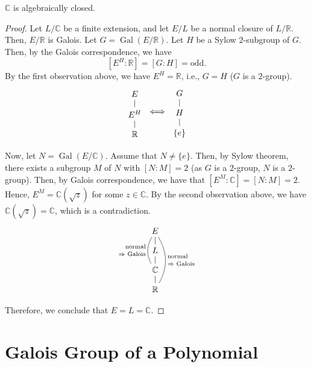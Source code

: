 \documentclass[twoside]{article}
\DeclareMathOperator\Gal{Gal}
\newcommand\R{\mathbb R}
\newcommand\C{\mathbb C}
\theoremstyle{remark}
\newcounter{theorem}
\begin{document}
\begin{theorem}
  \(\C\) is algebraically closed.
\end{theorem}

\begin{proof}
  Let \(L/\C\) be a finite extension, and let \(E/L\) be a normal closure of \(L/\R\). Then, \(E/\R\) is Galois. Let \(G = \Gal(E/\R)\). Let \(H\) be a Sylow \(2\)-subgroup of \(G\). Then, by the Galois correspondence, we have
  \[ [E^H:\R] = [G:H] = \mathrm{odd}. \]
  By the first observation above, we have \(E^H = \R\), i.e., \(G=H\) (\(G\) is a \(2\)-group).
  \begin{displaymath}
    \begin{tikzcd}[row sep=small]
      E \dar[dash] \\ E^H \dar[dash] \\ \R
    \end{tikzcd}
    \iff
    \begin{tikzcd}[row sep=small]
      G \dar[dash] \\ H \dar[dash] \\ \{e\}
    \end{tikzcd}
  \end{displaymath}
  
  Now, let \(N = \Gal(E/\C)\). Assume that \(N \neq \{e\}\). Then, by Sylow theorem, there exists a subgroup \(M\) of \(N\) with \([N:M] = 2\) (as \(G\) is a \(2\)-group, \(N\) is a \(2\)-group). Then, by Galois correspondence, we have that \([E^M:\C] = [N:M] = 2\). Hence, \(E^M = \C(\sqrt z)\) for some \(z \in \C\). By the second observation above, we have \(\C(\sqrt z) = \C\), which is a contradiction.
  \begin{displaymath}
    \begin{tikzcd}[row sep=small]
      E\dar[dash]\ar[ddd, dash, "\text{\parbox{2cm}{\raggedright normal \\[-1ex] \(\Rightarrow\) Galois}}", bend left]\ar[dd, dash, "\text{\parbox{2cm}{\raggedleft normal \\[-1ex] \(\Rightarrow\) Galois}}"swap, bend right] \\ L\dar[dash] \\ \C\dar[dash] \\ \R
    \end{tikzcd}
  \end{displaymath}
  
  Therefore, we conclude that \(E = L = \C\).
\end{proof}

\section{Galois Group of a Polynomial}
\end{document}
